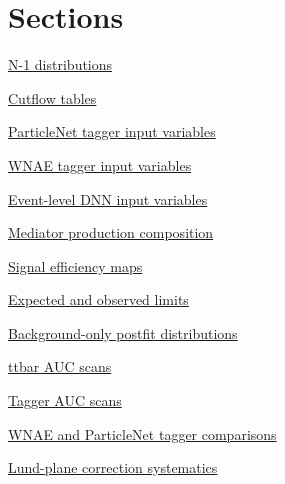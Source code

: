 \documentclass[11pt]{article}
\begin{document}
\section*{Sections}
\noindent\hyperref[sec:nminus1-distributions]{N-1 distributions}\par
\noindent\hyperref[sec:cutflow-tables]{Cutflow tables}\par
\noindent\hyperref[sec:pnet-inputs]{ParticleNet tagger input variables}\par
\noindent\hyperref[sec:wnae-inputs]{WNAE tagger input variables}\par
\noindent\hyperref[sec:dnn-inputs]{Event-level DNN input variables}\par
\noindent\hyperref[sec:mediator-production-composition]{Mediator production composition}\par
\noindent\hyperref[sec:signal-efficiency-maps]{Signal efficiency maps}\par
\noindent\hyperref[sec:limits]{Expected and observed limits}\par
\noindent\hyperref[sec:postfits-bonly]{Background-only postfit distributions}\par
\noindent\hyperref[sec:ttbar-auc]{ttbar AUC scans}\par
\noindent\hyperref[sec:pnet-auc-extra-axes]{Tagger AUC scans}\par
\noindent\hyperref[sec:tagger-comparisons]{WNAE and ParticleNet tagger comparisons}\par
\noindent\hyperref[sec:lund-systematics]{Lund-plane correction systematics}\par
\clearpage
\end{document}
